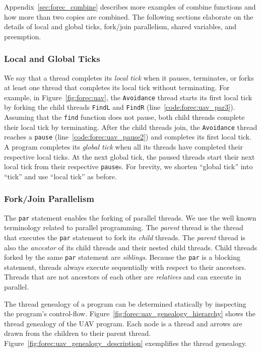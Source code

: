 Appendix~\ref{sec:forec_combine} describes more examples
of combine functions and how more than two
copies are combined. The following sections elaborate on the
details of local and global ticks, fork/join parallelism,
shared variables, and preemption.



\subsubsection{Local and Global Ticks}
We say that a thread completes its \emph{local tick} when it
pauses, terminates, or forks at least one thread that
completes its local tick without terminating. For example,
in Figure~\ref{fig:forec:uav}, the \verb$Avoidance$ thread 
starts its first local tick 
by forking the child threads \verb$FindL$ and \verb$FindR$
(line~\ref{code:forec:uav_par3}). Assuming that the
\verb$find$ function does not pause, both child threads
complete their local tick by terminating. After the child
threads join, the \verb$Avoidance$ thread reaches a
\verb$pause$ (line~\ref{code:forec:uav_pause2}) and
completes its first local tick. A program completes its
\emph{global tick} when all its threads have completed their
respective local ticks. At the next global tick, the paused
threads start their next local tick from their respective
\verb$pause$s. For brevity, we shorten ``global tick'' into
``tick'' and use ``local tick'' as before.



\subsubsection{Fork/Join Parallelism}
The \verb$par$ statement enables the forking of parallel
threads. We use the well known terminology related
to parallel programming. The
\emph{parent} thread is the thread that executes the
\verb$par$ statement to fork its \emph{child} threads. The
\emph{parent} thread is also the \emph{ancestor} of its
child threads and their nested child threads. Child threads
forked by the same \verb$par$ statement are \emph{siblings}.
Because the \verb$par$ is a blocking statement, threads
always execute sequentially with respect to their ancestors.
Threads that are not ancestors of each other are
\emph{relatives} and can execute in parallel. 

The thread genealogy of a program can be determined statically by
inspecting the program's control-flow.
Figure~\ref{fig:forec:uav_genealogy_hierarchy} shows the
thread genealogy of the UAV program. Each node is a
thread and arrows are drawn from the children to their
parent thread. Figure~\ref{fig:forec:uav_genealogy_description}
exemplifies the thread genealogy.

